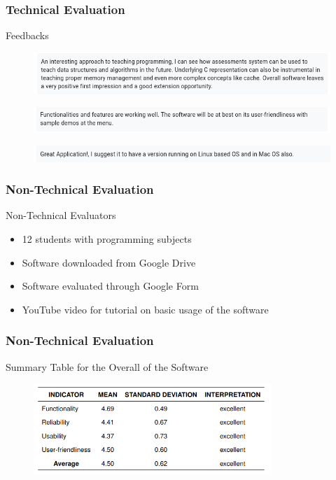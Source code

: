 \documentclass[handout]{beamer}
\begin{document}
\begin{frame}
	\frametitle{Technical Evaluation}
	\begin{block}{Feedbacks}
		\begin{figure}
			\includegraphics[width=\textwidth]{figures/feedbacks/tech1.png}
		\end{figure}
		\begin{figure}
			\includegraphics[width=\textwidth]{figures/feedbacks/tech2.png}
		\end{figure}
		\begin{figure}
			\includegraphics[width=\textwidth]{figures/feedbacks/tech3.png}
		\end{figure}
	\end{block}
\end{frame}

\begin{frame}
	\frametitle{Non-Technical Evaluation}
	\begin{block}{Non-Technical Evaluators}
		\begin{itemize}
			\item<1-> 12 students with programming subjects
			\item<2-> Software downloaded from Google Drive
			\item<3-> Software evaluated through Google Form
			\item<4-> YouTube video for tutorial on basic usage of the software
		\end{itemize}
	\end{block}
\end{frame}

\begin{frame}
	\frametitle{Non-Technical Evaluation}
	\begin{block}{Summary Table for the Overall of the Software}
		\begin{figure}
			\includegraphics[width=0.8\textwidth]{figures/res_non_tech_overall.png}
		\end{figure}
	\end{block}
\end{frame}
\end{document}
